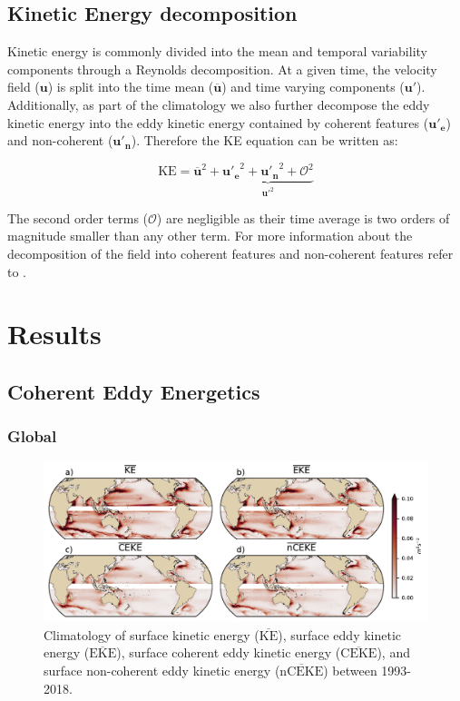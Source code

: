 \documentclass[draft,linenumbers]{agujournal2019}
\newcommand{\MKE}{\overline{\textrm{KE}}}
\newcommand{\MEKE}{\overline{\textrm{EKE}}}
\newcommand{\MCEKE}{\overline{\textrm{CEKE}}}
\newcommand{\MnCEKE}{\overline{\textrm{nCEKE}}}
\begin{document}
	\subsection{Kinetic Energy decomposition}

	Kinetic energy is commonly divided into the mean and temporal variability components through a Reynolds decomposition. At a given time, the velocity field ($\mathbf{u}$) is split into the time mean ($\mathbf{\overline{u}}$) and time varying components ($\mathbf{u'}$). Additionally, as part of the climatology we also further decompose the eddy kinetic energy into the eddy kinetic energy contained by coherent features ($\mathbf{u'_e}$) and non-coherent ($\mathbf{u'_n}$). Therefore the KE equation can be written as:
	
	\begin{equation}
		\mathrm{KE}= \mathbf{\overline{u}}^2 +\underbrace{ \mathbf{u'_e}^2+ \mathbf{u'_n}^2 + \mathcal{O}^2}_{\mathbf{u'}^2}
	\end{equation}
	
	The second order terms ($\mathcal{O}$) are negligible as their time average is two orders of magnitude smaller than any other term. For more information about the decomposition of the field into coherent features and non-coherent features refer to \citet{Martinez_Kinetic_2019}.

	\section{Results}
	\label{sec:Results}
	
	\subsection{Coherent Eddy Energetics}
	\label{subsec:R_season}
	
	\subsubsection{Global}

	\begin{figure}
	    \centering
	    \includegraphics[width=1\textwidth]{figures/mean_ke_maps_satellite.pdf}
	    \caption{Climatology of surface kinetic energy ($\MKE$), surface eddy kinetic energy ($\MEKE$), surface coherent eddy kinetic energy ($\MCEKE$), and surface non-coherent eddy kinetic energy ($\MnCEKE$) between 1993-2018.}
	    \label{fig:eddy_climatology}
	\end{figure}
	
\end{document}
